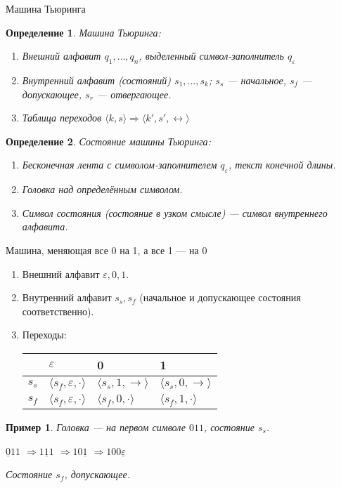 \documentclass[aspectratio=169]{beamer}
\newtheorem{dfn}{Определение}[section]
\newtheorem{exm}{Пример}[section]
\begin{document}
\begin{frame}{Машина Тьюринга}
\begin{dfn}Машина Тьюринга:
\begin{enumerate}
\item Внешний алфавит $q_1, \dots, q_n$, выделенный символ-заполнитель $q_\varepsilon$
\item Внутренний алфавит (состояний) $s_1, \dots, s_k$; $s_s$ --- начальное, $s_f$ --- допускающее, $s_r$ --- отвергающее.
\item Таблица переходов $\langle k, s \rangle \Rightarrow \langle k', s', \leftrightarrow \rangle$
\end{enumerate}
\end{dfn}

\begin{dfn}Состояние машины Тьюринга:
\begin{enumerate}
\item Бесконечная лента с символом-заполнителем $q_\varepsilon$, текст конечной длины.
\item Головка над определённым символом.
\item Символ состояния (состояние в узком смысле) --- символ внутреннего алфавита.
\end{enumerate}
\end{dfn}

\end{frame}

\begin{frame}{Машина, меняющая все 0 на 1, а все 1 --- на 0}
\begin{enumerate}
\item Внешний алфавит $\varepsilon, 0, 1$.
\item Внутренний алфавит $s_s, s_f$ (начальное и допускающее состояния соответственно).
\item Переходы:

\begin{tabular}{l|lll}
    & $\varepsilon$ & 0 & 1\\\hline
$s_s$ & $\langle s_f,\varepsilon,\cdot\rangle$ & $\langle s_s,1,\rightarrow\rangle$ & $\langle s_s,0,\rightarrow\rangle$\\
$s_f$ & $\langle s_f,\varepsilon,\cdot\rangle$ & $\langle s_f,0,\cdot\rangle$ & $\langle s_f,1,\cdot\rangle$
\end{tabular}
\end{enumerate}\pause

\begin{exm}
Головка --- на первом символе $011$, состояние $s_s$.\pause

$\underline{0}11$ \pause $\Rightarrow 1\underline{1}1$ \pause $\Rightarrow 10\underline{1}$ \pause $\Rightarrow 100\underline{\varepsilon}$
\pause

Состояние $s_f$, допускающее.
\end{exm}

\end{frame}
\end{document}
